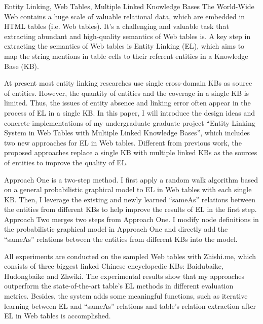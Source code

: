 \documentclass[bachelor]{seuthesis} %
\begin{document}
\begin{englishabstract}{Entity Linking, Web Tables, Multiple Linked Knowledge Bases}
The World-Wide Web contains a huge scale of valuable relational data, which are embedded in HTML tables (i.e. Web tables). It's a challenging and valuable task that extracting abundant and high-quality semantics of Web tables is. A key step in extracting the semantics of Web tables is Entity Linking (EL), which aims to map the string mentions in table cells to their referent entities in a Knowledge Base (KB).\par

At present most entity linking researches use single cross-domain KBs as source of entities. However, the quantity of entities and the coverage in a single KB is limited. Thus, the issues of entity absence and linking error often appear in the process of EL in a single KB. In this paper, I will introduce the design ideas and concrete implementations of my undergraduate graduate project ``Entity Linking System in Web Tables with Multiple Linked Knowledge Bases'', which includes two new approaches for EL in Web tables. Different from previous work, the proposed approaches replace a single KB with multiple linked KBs as the sources of entities to improve the quality of EL.

Approach One is a two-step method. I first apply a random walk algorithm based on a general probabilistic graphical model to EL in Web tables with each single KB. Then, I leverage the existing and newly learned ``sameAs'' relations between the entities from different KBs to help improve the results of EL in the first step. Approach Two merges two steps from Approach One. I modify node definitions in the probabilistic graphical model in Approach One and directly add the ``sameAs'' relations between the entities from different KBs into the model.\par

All experiments are conducted on the sampled Web tables with Zhishi.me, which consists of three biggest linked Chinese encyclopedic KBs: Baidubaike, Hudongbaike and Zhwiki. The experimental results show that my approaches outperform the state-of-the-art table's EL methods in different evaluation metrics. Besides, the system adds some meaningful functions, such as iterative learning between EL and ``sameAs'' relations and table's relation extraction after EL in Web tables is accomplished.
\end{englishabstract}

\tableofcontents
\end{document}
